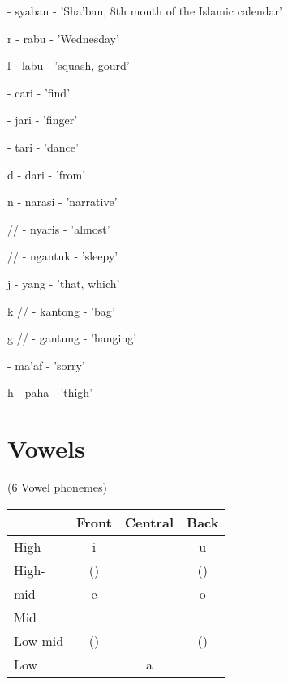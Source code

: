 \documentclass[a4paper, 12pt]{article}
\begin{document}
\textesh \qquad  \textipa{["Saban]} - syaban - 'Sha'ban, 8th month of the Islamic calendar'

r \qquad \textipa{[ra"bu]} - rabu - 'Wednesday'

l \qquad \textipa{["labu]} - labu - 'squash, gourd'

\medskip

\textteshlig \qquad {} - cari - 'find'

\textdyoghlig \qquad {} - jari - 'finger'

\textipa{\|[t} \qquad \textipa{["\|[tari]} - tari - 'dance'

d \qquad \textipa{["dari]} - dari - 'from'

\medskip

n \qquad \textipa{[na"rasi]} - narasi - 'narrative'
 
\textltailn \qquad // \qquad {} - nyaris - 'almost'

 \qquad // \qquad \textipa{[Nan"\|[t{\textupsilon}P]} - ngantuk - 'sleepy'

\medskip

j \qquad \textipa{["jaN]} - yang - 'that, which'

k \qquad // \qquad {} - kantong - 'bag'

g \qquad // \qquad \textipa{["gantoN]} - gantung - 'hanging'


\medskip

\textglotstop \qquad \textipa{["maPaf]} - ma'af - 'sorry'

h \qquad \textipa{["paha]} - paha - 'thigh'

\medskip
\section{Vowels}

(6 Vowel phonemes) \\ \medskip

\begin{center}
	\begin{tabular}{|p{2cm}|*{3}{c |}}
		\hline
		& Front & Central & Back \\ \hline
		 High & i & & u \\ \hline
	     High-  & (\textsci) & & (\textupsilon) \\ 
	     mid  & e &  & o\\ \hline
		 Mid & & \textschwa & \\ \hline
		 Low-mid  & (\textepsilon) & & (\textopeno) \\ \hline
		Low &  & a & \\ \hline
	\end{tabular}	\\
\end{center}
\end{document}
